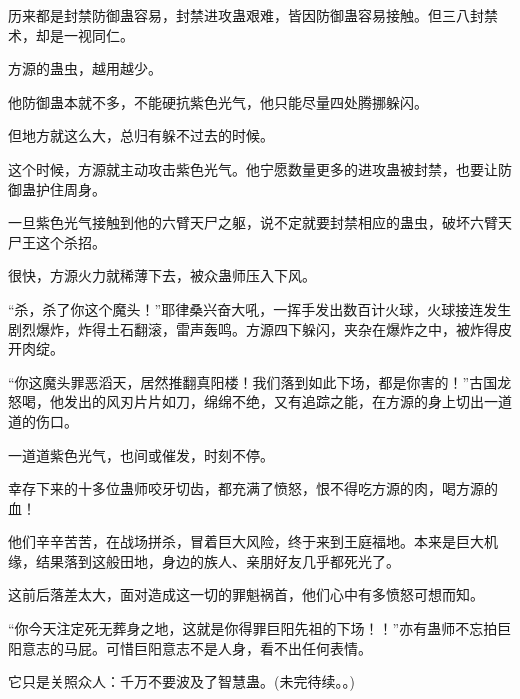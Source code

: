 \begin{this_body}
历来都是封禁防御蛊容易，封禁进攻蛊艰难，皆因防御蛊容易接触。但三八封禁术，却是一视同仁。

方源的蛊虫，越用越少。

他防御蛊本就不多，不能硬抗紫色光气，他只能尽量四处腾挪躲闪。

但地方就这么大，总归有躲不过去的时候。

这个时候，方源就主动攻击紫色光气。他宁愿数量更多的进攻蛊被封禁，也要让防御蛊护住周身。

一旦紫色光气接触到他的六臂天尸之躯，说不定就要封禁相应的蛊虫，破坏六臂天尸王这个杀招。

很快，方源火力就稀薄下去，被众蛊师压入下风。

“杀，杀了你这个魔头！”耶律桑兴奋大吼，一挥手发出数百计火球，火球接连发生剧烈爆炸，炸得土石翻滚，雷声轰鸣。方源四下躲闪，夹杂在爆炸之中，被炸得皮开肉绽。

“你这魔头罪恶滔天，居然推翻真阳楼！我们落到如此下场，都是你害的！”古国龙怒喝，他发出的风刃片片如刀，绵绵不绝，又有追踪之能，在方源的身上切出一道道的伤口。

一道道紫色光气，也间或催发，时刻不停。

幸存下来的十多位蛊师咬牙切齿，都充满了愤怒，恨不得吃方源的肉，喝方源的血！

他们辛辛苦苦，在战场拼杀，冒着巨大风险，终于来到王庭福地。本来是巨大机缘，结果落到这般田地，身边的族人、亲朋好友几乎都死光了。

这前后落差太大，面对造成这一切的罪魁祸首，他们心中有多愤怒可想而知。

“你今天注定死无葬身之地，这就是你得罪巨阳先祖的下场！！”亦有蛊师不忘拍巨阳意志的马屁。可惜巨阳意志不是人身，看不出任何表情。

它只是关照众人：千万不要波及了智慧蛊。(未完待续。。)

\end{this_body}

